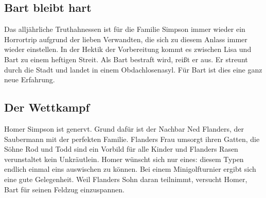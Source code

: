 \subsection{Bart bleibt hart}\label{7F07}
Das alljährliche Truthahnessen ist für die Familie Simpson immer wieder ein Horrortrip aufgrund der lieben Verwandten, die sich zu diesem Anlass immer wieder einstellen. In der Hektik der Vorbereitung kommt es zwischen Lisa und Bart zu einem heftigen Streit. Als Bart bestraft wird, reißt er aus. Er streunt durch die Stadt und landet in einem Obdachlosenasyl. Für Bart ist dies eine ganz neue Erfahrung.



\subsection{Der Wettkampf}\label{7F08}
Homer Simpson ist genervt. Grund dafür ist der Nachbar Ned Flanders, der Saubermann mit der perfekten Familie. Flanders Frau umsorgt ihren Gatten, die Söhne Rod und Todd sind ein Vorbild für alle Kinder und Flanders Rasen verunstaltet kein Unkräutlein. Homer wünscht sich nur eines: diesem Typen endlich einmal eins auswischen zu können. Bei einem Minigolfturnier ergibt sich eine gute Gelegenheit. Weil Flanders Sohn daran teilnimmt, versucht Homer, Bart für seinen Feldzug einzuspannen.

